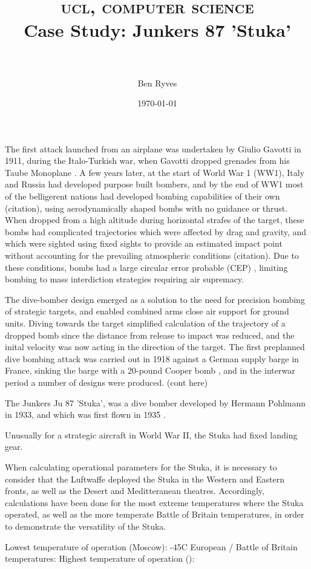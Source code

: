 \documentclass[a4paper, fontsize=11pt]{scrartcl} %
\title{
        \normalfont \normalsize
        \textsc{ucl, computer science}
        \horrule{0.5pt} \\[0.4cm]
        \huge{Case Study: Junkers 87 'Stuka'}\\
        \horrule{0.5pt} \\[0.5cm]
}
\author{Ben Ryves}
\date{\normalsize\today}
\begin{document}
\maketitle





The first attack launched from an airplane was undertaken by Giulio
Gavotti in 1911, during the Italo-Turkish war, when Gavotti dropped
grenades from his Taube Monoplane \autocite{bbc11}. A few years later,
at the start of World War 1 (WW1), Italy and Russia had developed purpose
built bombers, and by the end of WW1 most of the belligerent nations
had developed bombing capabilities of their own (citation), using
aerodynamically shaped bombs with no guidance or thrust. When dropped from a
high altitude during horizontal strafes of the target, these bombs had
complicated trajectories which were affected by drag and gravity, and
which were sighted using fixed sights to provide an estimated impact point
without accounting for the prevailing atmospheric conditions
(citation). Due to these conditions, bombs had a large circular error
probable (CEP) \autocite{cep88}, limiting bombing to mass
interdiction strategies requiring air supremacy.

The dive-bomber design emerged as a solution to the need for precision
bombing of strategic targets, and enabled combined arms close air
support for ground units. Diving towards the target simplified
calculation of the trajectory of a dropped bomb since the distance
from release to impact was reduced, and the inital velocity was now
acting in the direction of the target. The first preplanned dive bombing
attack was carried out in 1918 against a German supply barge in France,
sinking the barge with a 20-pound Cooper bomb \autocite[p.~72]{boyne10},
and in the interwar period a number of designs were produced. (cont here)

The Junkers Ju 87 'Stuka', was a dive bomber developed by Hermann
Pohlmann in 1933, and which was first flown in 1935 \autocite[p.~9]{weal97}.

Unusually for a strategic aircraft in World War II, the Stuka had fixed
landing gear.\autocite[p.~4]{curry88}

When calculating operational parameters for the Stuka, it is necessary
to consider that the Luftwaffe deployed the Stuka in the Western and
Eastern fronts, as well as the Desert and Meditteranean theatres.
Accordingly, calculations have been done for the most extreme
temperatures where the Stuka operated, as well as the more temperate
Battle of Britain temperatures, in order to demonstrate the versatility
of the Stuka.

Lowest temperature of operation (Moscow): -45C \autocite{raus03}
European / Battle of Britain temperatures:
Highest temperature of operation ():


\printbibliography
\end{document}
